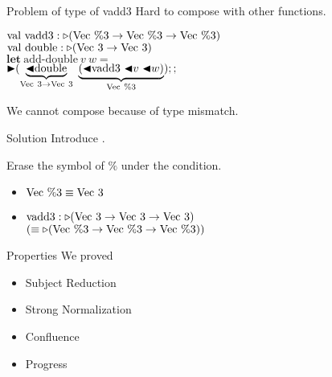 \documentclass[dvipdfmx,aspectratio=169, 20pt]{beamer}
\begin{document}
\begin{frame}[fragile]{Problem of type of vadd3}
    Hard to compose with other functions.
    \newcommand{\Vn}{\text{Vec}\ \%n}
    \newcommand{\Vpt}{\text{Vec}\ \%3}
    \newcommand{\Vt}{\text{Vec}\ 3}
    \begin{tabbing}
        \hspace{5mm} \= \( \text{val}\ \text{vadd3} : \TW (\Vpt \to \Vpt \to \Vpt) \) \\
        \> \( \text{val}\ \text{double} : \TW (\Vt \to \Vt) \) \\[2mm]
        \> \( \textbf{let}\ \text{add-double}\ v\ w = \) \\
        \> \hspace{5mm} \( \TB (\underbrace{\TBL\text{double}}_{\Vt \to \Vt}\ \underbrace{(\TBL \text{vadd3}\ \TBL v\ \TBL w)}_{\Vpt});; \) \\
    \end{tabbing}
    We cannot compose because of type mismatch.
\end{frame}

\begin{frame}[fragile]{Solution}
    \newcommand{\Vt}{\text{Vec}\ 3}
    \newcommand{\Vpt}{\text{Vec}\ \%3}
    Introduce \QPercent.
    \begin{center}
    \end{center}
    Erase the symbol of \( \% \) under the condition.
    \begin{itemize}
        \item \( \text{Vec}\ \%3 \equiv \text{Vec}\ 3 \)
        \item \( \text{vadd3} : \TW (\Vt \to \Vt \to \Vt) \) \\
            \hspace{15mm} \( (\E  \TW (\Vpt \to \Vpt \to \Vpt)) \)
    \end{itemize}
\end{frame}

\begin{frame}[fragile]{Properties}
    We proved
    \begin{itemize}
        \item Subject Reduction
        \item Strong Normalization
        \item Confluence
        \item Progress
    \end{itemize}
    \note{
    }
\end{frame}
\end{document}
